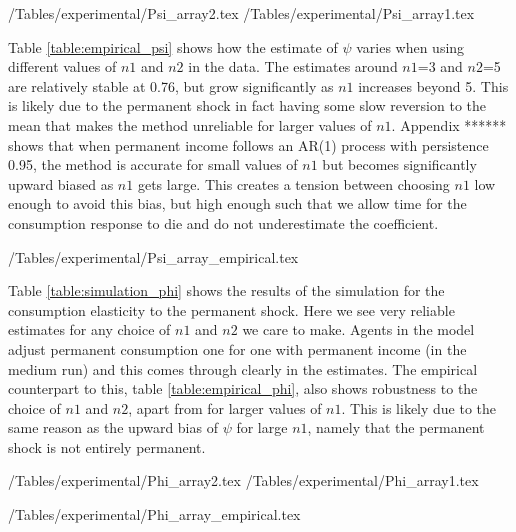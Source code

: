 \documentclass[titlepage]{\econtex}\newcommand{\texname}{IncomeUncertainty}
\begin{document}
\begin{center}
	\econtexRoot/Tables/experimental/Psi_array2.tex	\econtexRoot/Tables/experimental/Psi_array1.tex
	\label{table:simulation_psi}
\end{center}
Table \ref{table:empirical_psi} shows how the estimate of $\psi$ varies when using different values of $n1$ and $n2$ in the data. The estimates around $n1$=3 and $n2$=5 are relatively stable at 0.76, but grow significantly as $n1$ increases beyond 5. This is likely due to the permanent shock in fact having some slow reversion to the mean that makes the method unreliable for larger values of $n1$. Appendix ****** shows that when permanent income follows an AR(1) process with persistence 0.95, the method is accurate for small values of $n1$ but becomes significantly upward biased as $n1$ gets large. This creates a tension between choosing $n1$ low enough to avoid this bias, but high enough such that we allow time for the consumption response to die and do not underestimate the coefficient.
\begin{center}
	\econtexRoot/Tables/experimental/Psi_array_empirical.tex		
	\label{table:empirical_psi}
\end{center}
Table \ref{table:simulation_phi} shows the results of the simulation for the consumption elasticity to the permanent shock. Here we see very reliable estimates for any choice of $n1$ and $n2$ we care to make. Agents in the model adjust permanent consumption one for one with permanent income (in the medium run) and this comes through clearly in the estimates. The empirical counterpart to this, table \ref{table:empirical_phi}, also shows robustness to the choice of $n1$ and $n2$, apart from for larger values of $n1$. This is likely due to the same reason as the upward bias of $\psi$ for large $n1$, namely that the permanent shock is not entirely permanent.
\begin{center}
	\econtexRoot/Tables/experimental/Phi_array2.tex	\econtexRoot/Tables/experimental/Phi_array1.tex
	\label{table:simulation_phi}
\end{center}

\begin{center}
	\econtexRoot/Tables/experimental/Phi_array_empirical.tex		
	\label{table:empirical_phi}
\end{center}
\end{document}
